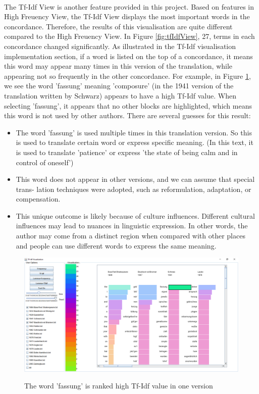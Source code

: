 \paragraph[]{}The Tf-Idf View is another feature provided in this project. Based on features in High Freuency View, the Tf-Idf View displays the most important words in the concordance. Therefore, the results of this visualisation are quite different compared to the High Freuency View. In Figure \ref{fig:tfIdfView}, 27, terms in each concordance changed significantly. As illustrated in the Tf-Idf visualisation implementation section, if a word is listed on the top of a concordance, it means this word may appear many times in this version of the translation, while appearing not so frequently in the other concordance. For example, in Figure \ref{fig:fassung}, we see the word 'fassung' meaning 'composure' (in the 1941 version of the translation written by Schwarz) appears to have a high Tf-Idf value. When selecting 'fassung', it appears that no other blocks are highlighted, which means this word is not used by other authors. There are several guesses for this result:
\begin{itemize} 	
	\item \textbf{} The word 'fassung' is used multiple times in this translation version. So this is used to translate certain word or express specific meaning. (In this text, it is used to translate 'patience' or express 'the state of being calm and in control of oneself')
	\item \textbf{} This word does not appear in other versions, and we can assume that special trans- lation techniques were adopted, such as reformulation, adaptation, or compensation. 
	\item \textbf{} This unique outcome is likely because of  culture influences. Different cultural influences may lead to nuances in linguistic expression. In other words, the author may come from a distinct region when compared with other places and people can use different words to express the same meaning.
\end{itemize} 

\begin{figure}[H]
	\centering	
	\includegraphics[scale=0.5]{Figs/Fassung}\\[1ex]
	\caption{The word 'fassung' is ranked high Tf-Idf value in one version}
	\label{fig:fassung}
\end{figure} 

